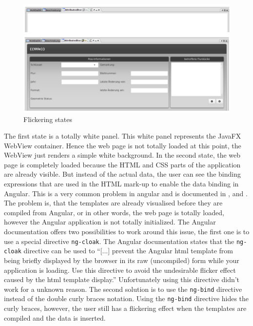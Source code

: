 \begin{figure}
\centering \includegraphics[width=1.0\textwidth]{./img/impl/flickering_states.png}
	\caption{Flickering states}
	\label{fig:flickering}
\end{figure}
The first state is a totally white panel. This white panel represents the JavaFX WebView container. Hence the web page is not totally loaded at this point, the WebView just renders a simple white background. 
In the second state, the web page is completely loaded because the HTML and CSS parts of the application are already visible. 
But instead of the actual data, the user can see the binding expressions that are used in the HTML mark-up to enable the data binding in Angular. 
This is a very common problem in angular and is documented in \autocite{impl:ng-cloak}, \autocite{impl:ng-bind} and \autocite{impl:stackoverflow-ng-cloak}. 
The problem is, that the templates are already visualised before they are compiled from Angular, or in other words, the web page is totally loaded, however the Angular application is not totally initialized. 
The Angular documentation offers two possibilities to work around this issue, the first one is to use a special directive \texttt{ng-cloak}. 
The Angular documentation states that the \texttt{ng-cloak} directive can be used to \enquote{[...] prevent the Angular html template from being briefly displayed by the browser in its raw (uncompiled) form while your application is loading. Use this directive to avoid the undesirable flicker effect caused by the html template display.} \autocite{impl:ng-cloak}
Unfortunately using this directive didn't work for a unknown reason. 
The second solution is to use the \texttt{ng-bind} directive instead of the double curly braces notation.
Using the \texttt{ng-bind} directive hides the curly braces, however, the user still has a flickering effect when the templates are compiled and the data is inserted.

